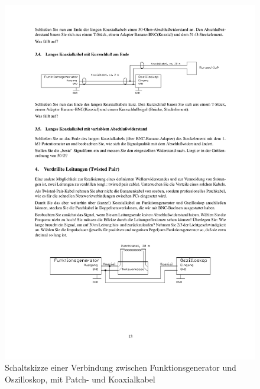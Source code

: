 \documentclass[12pt,a4paper]{article}
\begin{document}
\begin{figure}[H] 
  \centering
    \includegraphics[trim = 10mm 60mm 10mm 200mm, clip, scale = 1]{3_4-4.pdf}
  	\caption[Schaltskizze einer Verbindung zwischen Funktionsgenerator und Oszilloskop, mit Patch- und Koaxialkabel]{Schaltskizze einer Verbindung zwischen Funktionsgenerator und Oszilloskop, mit Patch- und Koaxialkabel\footnotemark}
  \label{fig:4.1}
\end{figure}
\end{document}
